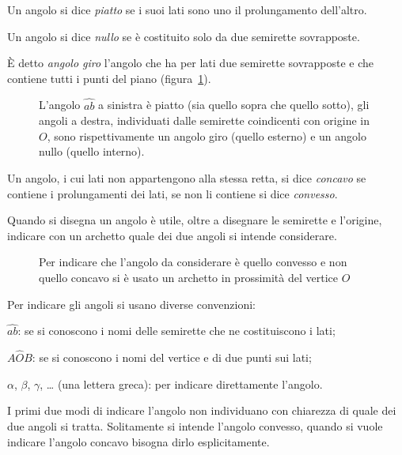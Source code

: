 \begin{definizione}
Un angolo si dice \emph{piatto} se i suoi lati sono uno il prolungamento dell'altro.
\end{definizione}

\begin{definizione}
Un angolo si dice \emph{nullo} se è costituito solo da due semirette sovrapposte.
\end{definizione}

\begin{definizione}
\`E detto \emph{angolo giro} l'angolo che ha per lati due semirette sovrapposte e che contiene tutti i punti del piano (figura~\ref{fig:1.19}).
\end{definizione}
\begin{figure}[bth]
 \centering 
 \caption{L'angolo  $\widehat{ab}$ a sinistra è piatto (sia quello sopra che quello sotto), gli angoli a destra, individuati dalle semirette coindicenti con origine in $O$, sono rispettivamente un angolo giro (quello esterno) e un angolo nullo (quello interno).}\label{fig:1.19}
\end{figure}

\begin{definizione}
Un angolo, i cui lati non appartengono alla stessa retta, si dice \emph{concavo} se contiene i prolungamenti dei lati, se non li contiene si dice \emph{convesso}.
\end{definizione}

\begin{figure*}[htb]
\centering  
\caption{L'angolo concavo è quello in giallo in quanto contiene i prolungamenti dei lati (punteggiati)}\label{fig:1.20}
\end{figure*}

Quando si disegna un angolo è utile, oltre a disegnare le semirette e l'origine, indicare con un archetto quale dei due angoli si intende considerare.

\begin{figure}[htb]
 \centering 
\caption{Per indicare che l'angolo da considerare è quello convesso e non quello concavo si è usato un archetto in prossimità del vertice $O$}\label{fig:1.21}
\end{figure}

Per indicare gli angoli si usano diverse convenzioni:
\begin{itemize*}
\item  $\widehat{ab}$: se si conoscono i nomi delle semirette che ne costituiscono i lati;
\item  $A\widehat{O}B$: se si conoscono i nomi del vertice e di due punti sui lati;
\item  $\alpha$, $\beta$, $\gamma$, \ldots{} (una lettera greca): per indicare direttamente l'angolo.
\end{itemize*}
I primi due modi di indicare l'angolo non individuano con chiarezza di quale dei due angoli si tratta. Solitamente si intende l'angolo convesso, quando si vuole indicare l'angolo concavo bisogna dirlo esplicitamente.

